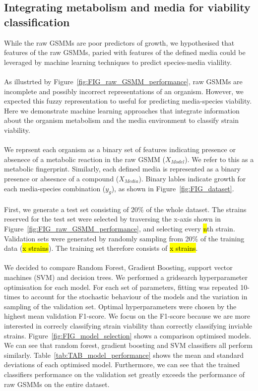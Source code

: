 \documentclass[11pt,a4paper]{article}
\begin{document}
\subsection*{Integrating metabolism and media for viability classification}
While the raw GSMMs are poor predictors of growth, we hypothesised that features of the raw GSMMs, paried with features of the defined media could be leveraged by machine learning techniques to predict species-media vialility.
\\\\
As illustrted by Figure~\ref{fig:FIG_raw_GSMM_performance}, raw GSMMs are incomplete and possibly incorrect representations of an organism. However, we expected this fuzzy representation to useful for predicting media-species viability. Here we demonstrate machine learning approaches that integrate information about the organism metabolism and the media environment to classify strain viability.
\\\\
We reprsent each organism as a binary set of features indicating presence or absenece of a metabolic reaction in the raw GSMM ($X_{Model}$). We refer to this as a metabolic fingerprint. Similarly, each defined media is represented as a binary presence or absesnce of a compound ($X_{Media}$). Binary lables indicate growth for each media-species combination ($y_{g}$), as shown in Figure~\ref{fig:FIG_dataset}. 
\\\\
First, we generate a test set consisting of 20\% of the whole dataset. The strains reserved for the test set were selected by traversing the x-axis shown in Figure~\ref{fig:FIG_raw_GSMM_performance}, and selecting every \hl{n}th strain. Validation sets were generated by randomly sampling from 20\% of the training data (\hl{x strains}). The training set therefore consists of \hl{x strains}.
\\\\
We decided to compare Random Forest, Gradient Boosting, support vector machines (SVM) and decision trees. We performed a gridsearch hyperparameter optimisation for each model. For each set of parameters, fitting was repeated 10-times to account for the stochastic behaviour of the models and the variation in sampling of the validation set. Optimal hyperparameters were chosen by the highest mean validation F1-score. We focus on the F1-score because we are more interested in correcly classifying strain viability than correctly classifying inviable strains. Figure~\ref{fig:FIG_model_selection} shows a comparison optimised models. We can see that random forest, gradient boosting and SVM classifiers all perform similarly. Table~\ref{tab:TAB_model_performance} shows the mean and standard deviations of each optimised model. Furthermore, we can see that the trained classifiers performance on the validation set greatly exceeds the performance of raw GSMMs on the entire dataset. 
\end{document}
